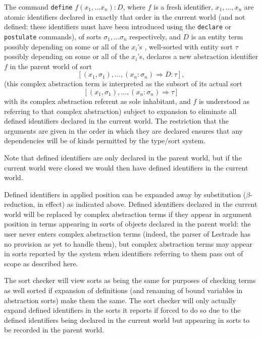 \documentclass[12pt]{article}
\begin{document}
The command {\tt define} $f(x_1,\ldots x_n): D$, where $f$ is a fresh identifier, $x_1, \ldots, x_n$ are atomic identifiers declared in exactly that order in the current world (and not defined:  these identifiers must have been introduced using the {\tt declare} or {\tt postulate} commands), of sorts $\sigma_1,\ldots \sigma_n$ respectively, and $D$ is an entity term possibly depending on some or all of the $x_i$'s , well-sorted with entity sort $\tau$ possibly depending on some or all of the $x_i$'s, declares a new abstraction identifier $f$ in the parent world of sort  $$[(x_1,\sigma_1),\ldots,(x_n:\sigma_n) \Rightarrow D:\tau],$$ (this complex abstraction term is interpreted as the subsort of its actual sort $$[(x_1,\sigma_1),\ldots,(x_n:\sigma_n) \Rightarrow \tau]$$ with its complex abstraction referent as sole inhabitant, and $f$ is understood as referring to that complex abstraction) subject to expansion to eliminate all defined identifiers declared in the current world.  The restriction that the arguments are given in the order in which they are declared ensures that any dependencies will be of kinds permitted by the type/sort system.

Note that defined identifiers are only declared in the parent world, but if the current world were closed we would then have defined identifiers in the current world.

Defined identifiers in applied position can be expanded away by substitution ($\beta$-reduction, in effect) as indicated above.  Defined identifiers declared in the current world will be replaced by complex abstraction terms if they appear in argument position in terms appearing in sorts of objects declared in the parent world:  the user never enters complex abstraction terms (indeed, the parser of Lestrade has no provision as yet to handle them), but complex abstraction terms may appear in sorts reported by the system when identifiers referring to them pass out of scope as described here.

The sort checker will view sorts as being the same for purposes of checking terms as well sorted if expansion of definitions (and renaming of bound variables in abstraction sorts) make them the same.  The sort checker will only actually expand defined identifiers in the sorts it reports if forced to do so due to the defined identifiers being declared in the current world but appearing in sorts to be recorded in the parent world.
\end{document}
